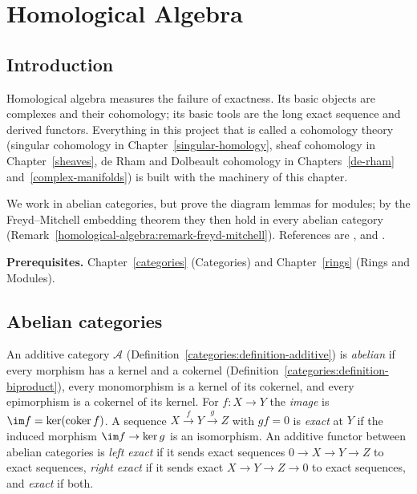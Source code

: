 \chapter{Homological Algebra}\label{homological-algebra}

\section{Introduction}\label{homological-algebra:section-introduction}

Homological algebra measures the failure of exactness. Its basic objects are complexes and their
cohomology; its basic tools are the long exact sequence and derived functors. Everything in this project
that is called a cohomology theory (singular cohomology in Chapter~\ref{singular-homology}, sheaf
cohomology in Chapter~\ref{sheaves}, de Rham and Dolbeault cohomology in
Chapters~\ref{de-rham} and~\ref{complex-manifolds}) is built with the machinery of this chapter.

We work in abelian categories, but prove the diagram lemmas for modules; by the Freyd--Mitchell embedding
theorem they then hold in every abelian category (Remark~\ref{homological-algebra:remark-freyd-mitchell}).
References are \cite{weibel-homological}, \cite{cartan-eilenberg} and \cite{gelfand-manin}.

\noindent\textbf{Prerequisites.} Chapter~\ref{categories} (Categories) and Chapter~\ref{rings} (Rings and
Modules).

\section{Abelian categories}\label{homological-algebra:section-abelian}

\begin{definition}\label{homological-algebra:definition-abelian}
An additive category $\mathcal{A}$ (Definition~\ref{categories:definition-additive}) is \emph{abelian} if every
morphism has a kernel and a cokernel (Definition~\ref{categories:definition-biproduct}), every monomorphism is a
kernel of its cokernel, and every epimorphism is a cokernel of its kernel. For $f \colon X \to Y$ the \emph{image} is
$\im f = \ker(\operatorname{coker} f)$. A sequence $X \xrightarrow{f} Y \xrightarrow{g} Z$ with $gf = 0$ is \emph{exact} at $Y$ if the
induced morphism $\im f \to \ker g$ is an isomorphism. An additive functor between abelian categories is
\emph{left exact} if it sends exact sequences $0 \to X \to Y \to Z$ to exact sequences, \emph{right exact} if it sends
exact $X \to Y \to Z \to 0$ to exact sequences, and \emph{exact} if both.
\end{definition}

